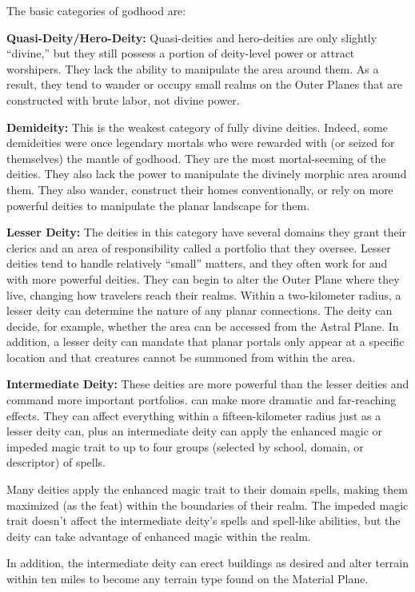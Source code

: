 The basic categories of godhood are:

\textbf{Quasi-Deity/Hero-Deity:} Quasi-deities and hero-deities are only slightly ``divine,'' but they still possess a portion of deity-level power or attract worshipers. They lack the ability to manipulate the area around them. As a result, they tend to wander or occupy small realms on the Outer Planes that are constructed with brute labor, not divine power.

\textbf{Demideity:} This is the weakest category of fully divine deities. Indeed, some demideities were once legendary mortals who were rewarded with (or seized for themselves) the mantle of godhood. They are the most mortal-seeming of the deities. They also lack the power to manipulate the divinely morphic area around them. They also wander, construct their homes conventionally, or rely on more powerful deities to manipulate the planar landscape for them.

\textbf{Lesser Deity:} The deities in this category have several domains they grant their clerics and an area of responsibility called a portfolio that they oversee. Lesser deities tend to handle relatively ``small'' matters, and they often work for and with more powerful deities. They can begin to alter the Outer Plane where they live, changing how travelers reach their realms. Within a two-kilometer radius, a lesser deity can determine the nature of any planar connections. The deity can decide, for example, whether the area can be accessed from the Astral Plane. In addition, a lesser deity can mandate that planar portals only appear at a specific location and that creatures cannot be summoned from within the area.

\textbf{Intermediate Deity:} These deities are more powerful than the lesser deities and command more important portfolios. can make more dramatic and far-reaching effects. They can affect everything within a fifteen-kilometer radius just as a lesser deity can, plus an intermediate deity can apply the enhanced magic or impeded magic trait to up to four groups (selected by school, domain, or descriptor) of spells.

Many deities apply the enhanced magic trait to their domain spells, making them maximized (as the  feat) within the boundaries of their realm. The impeded magic trait doesn't affect the intermediate deity's spells and spell-like abilities, but the deity can take advantage of enhanced magic within the realm.

In addition, the intermediate deity can erect buildings as desired and alter terrain within ten miles to become any terrain type found on the Material Plane.

